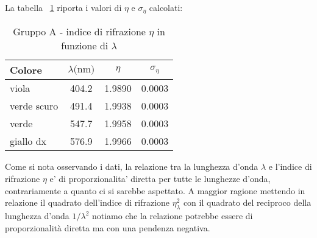 La tabella ~\ref{table:tbl6} riporta i valori di $\eta$ e $\sigma_{\eta}$ calcolati:
\begin{table}[!htbp]
    {\par\centering
    \begin{tabular}{lccc}
        \hline
            Colore &
            $\lambda \text{(nm)}$ & 
            $\eta$ & 
            $\sigma_{\eta}$ \\
        \hline
        viola       &   404.2   &   1.9890 &   0.0003 \\
        verde scuro &   491.4   &   1.9938 &   0.0003 \\
        verde       &   547.7   &   1.9958 &   0.0003 \\
        giallo dx   &   576.9   &   1.9966 &   0.0003 \\
        \hline
    \end{tabular}
    \par}
    \caption{Gruppo A - indice di rifrazione $\eta$ in funzione di $\lambda$} \label{table:tbl6}
\end{table}

Come si nota osservando i dati, la relazione tra la lunghezza d'onda $\lambda$ e l'indice di rifrazione $\eta$ e' di proporzionalita' diretta per tutte le lunghezze d'onda, contrariamente a quanto ci si sarebbe aspettato.
A maggior ragione mettendo in relazione il quadrato dell'indice di rifrazione $\eta_{\lambda}^2$ con il quadrato del reciproco della lunghezza d'onda $1/\lambda^2$ notiamo che la relazione potrebbe essere di proporzionalità diretta ma con una pendenza negativa.

\begin{center}
\end{center}

